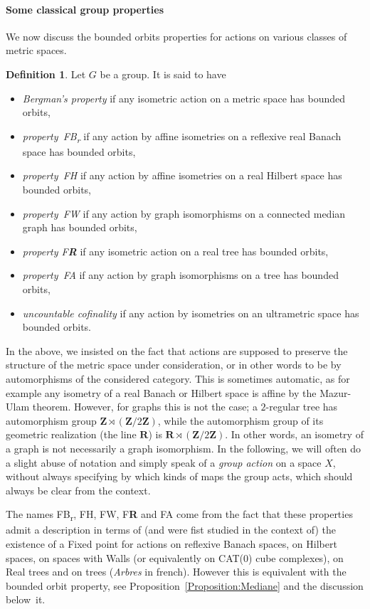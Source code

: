 \documentclass[a4paper]{article}
\theoremstyle{definition}
\newtheorem{defn}[lem]{Definition}
\newtheorem{rem}[lem]{Remark}
\newcommand*{\field}[1]{\mathbf{#1}}
\newcommand*{\Z}{\field{Z}}
\newcommand*{\R}{\field{R}}
\newcommand*{\FB}{FB\textsubscript{r}}
\newcommand*{\FH}{FH}
\newcommand*{\FW}{FW}
\newcommand*{\FA}{FA}
\newcommand*{\FR}{F\textbf{R}}
\begin{document}
\paragraph{Some classical group properties}
We now discuss the bounded orbits properties for actions on various classes of metric spaces.

%
%
\begin{defn}\label{Def:FHFA}
Let $G$ be a group.
It is said to have
\begin{itemize}
\item\emph{Bergman's property} if any isometric action on a metric space has bounded orbits,
\item\emph{property~\FB} if any action by affine isometries on a reflexive real Banach space has bounded orbits,
\item \emph{property~\FH} if any action by affine isometries on a real Hilbert space has bounded orbits,
\item
\emph{property~\FW} if any action by graph isomorphisms on a connected median graph has bounded orbits,
\item
\emph{property \FR} if any isometric action on a real tree has bounded orbits,
\item
\emph{property~\FA} if any action by graph isomorphisms on a tree has bounded orbits,
\item
\emph{uncountable cofinality} if any action by isometries on an ultrametric space has bounded orbits.
\end{itemize}
\end{defn}
%
%
In the above, we insisted on the fact that actions are supposed to preserve the structure of the metric space under consideration, or in other words to be by automorphisms of the considered category.
This is sometimes automatic, as for example any isometry of a real Banach or Hilbert space is affine by the Mazur-Ulam theorem.
However, for graphs this is not the case; a $2$-regular tree has automorphism group $\Z\rtimes(\Z/2\Z)$, while the automorphism group of its geometric realization (the line $\R$) is $\R\rtimes(\Z/2\Z)$.
In other words, an isometry of a graph is not necessarily a graph isomorphism.
In the following, we will often do a slight abuse of notation and simply speak of a \emph{group action} on a space $X$, without always specifying by which kinds of maps the group acts, which should always be clear from the context.

%
%
The names \FB, \FH, \FW,  \FR{} and \FA{} come from the fact that these properties admit a description in terms of (and were fist studied in the context of) the existence of a Fixed point for actions on reflexive Banach spaces, on Hilbert spaces, on spaces with Walls (or equivalently on CAT(0) cube complexes), on Real trees and on trees (\emph{Arbres} in french).
However this is equivalent with the bounded orbit property, see Proposition~\ref{Proposition:Mediane} and the discussion below~it.
\end{document}
